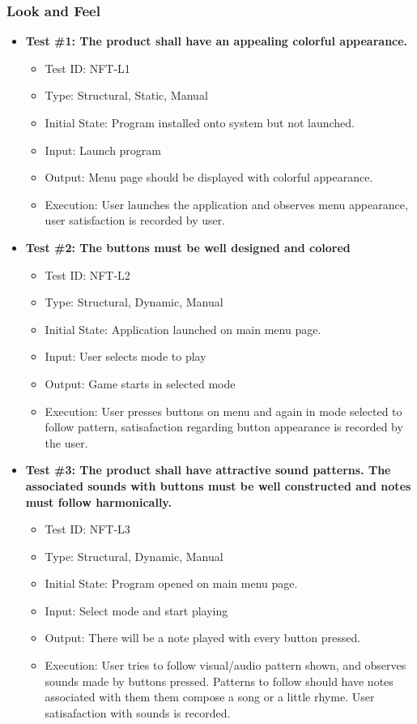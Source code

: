 \documentclass[12pt, titlepage]{article}
\begin{document}
\subsubsection{Look and Feel}
\begin{itemize}
\item \textbf{Test \#1: The product shall have an appealing colorful appearance.}
\begin{itemize}
\item Test ID: NFT-L1
\item Type: Structural, Static, Manual				
\item Initial State: Program installed onto system but not launched.		
\item Input: Launch program
\item Output: Menu page should be displayed with colorful appearance.		
\item Execution: User launches the application and observes menu appearance, user satisfaction is recorded by user.
\end{itemize}

\item \textbf{Test \#2: The buttons must be well designed and colored}
\begin{itemize}
\item Test ID: NFT-L2
\item Type: Structural, Dynamic, Manual			
\item Initial State: Application launched on main menu page.			
\item Input: User selects mode to play			
\item Output: Game starts in selected mode				
\item Execution: User presses buttons on menu and again in mode selected to follow pattern, satisafaction regarding button appearance is recorded by the user.
\end{itemize}

\item \textbf{Test \#3: The product shall have attractive sound patterns. The associated sounds with buttons must be well constructed and notes must follow harmonically.}
\begin{itemize}
\item Test ID: NFT-L3
\item Type: Structural, Dynamic, Manual				
\item Initial State: Program opened on main menu page.		
\item Input: Select mode and start playing
\item Output: There will be a note played with every button pressed.	
\item Execution: User tries to follow visual/audio pattern shown, and observes sounds made by buttons pressed. Patterns to follow should have notes associated with them them compose a song or a little rhyme. User satisafaction with sounds is recorded.
\end{itemize}
\end{itemize}
\end{document}
